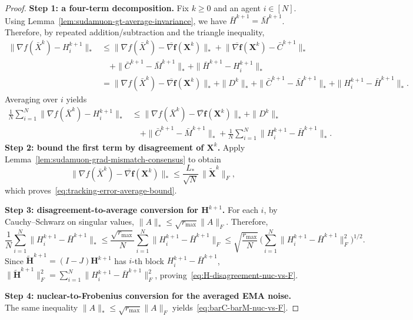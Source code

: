 \documentclass{article}
\begin{document}
\begin{proof}
\medskip\noindent\textbf{Step 1: a four-term decomposition.}
Fix $k\ge 0$ and an agent $i\in[N]$.
Using Lemma~\ref{lem:sudamuon-gt-average-invariance}, we have $\bar H^{k+1}=\bar M^{k+1}$.
Therefore, by repeated addition/subtraction and the triangle inequality,
\begin{align*}
\|\nabla f(\bar X^k)-H_i^{k+1}\|_*
&\le
\Big\|\nabla f(\bar X^k)-\overline{\nabla \mathbf f}(\mathbf X^k)\Big\|_*
+\Big\|\overline{\nabla \mathbf f}(\mathbf X^k)-\bar C^{k+1}\Big\|_* \\
&\quad +\|\bar C^{k+1}-\bar M^{k+1}\|_* + \|\bar H^{k+1}-H_i^{k+1}\|_* \\
&=
\Big\|\nabla f(\bar X^k)-\overline{\nabla \mathbf f}(\mathbf X^k)\Big\|_*
+\|D^k\|_* 
+\|\bar C^{k+1}-\bar M^{k+1}\|_* 
+\|H_i^{k+1}-\bar H^{k+1}\|_*.
\end{align*}
Averaging over $i$ yields
\begin{align*}
\frac{1}{N}\sum_{i=1}^N \|\nabla f(\bar X^k)-H_i^{k+1}\|_*
&\le
\Big\|\nabla f(\bar X^k)-\overline{\nabla \mathbf f}(\mathbf X^k)\Big\|_*
+\|D^k\|_* \\
&\quad+\|\bar C^{k+1}-\bar M^{k+1}\|_* 
+\frac{1}{N}\sum_{i=1}^N\|H_i^{k+1}-\bar H^{k+1}\|_*.
\end{align*}
\medskip\noindent\textbf{Step 2: bound the first term by disagreement of $\mathbf X^k$.}
Apply Lemma~\ref{lem:sudamuon-grad-mismatch-consensus} to obtain
\[
\Big\|\nabla f(\bar X^k)-\overline{\nabla \mathbf f}(\mathbf X^k)\Big\|_*
\le \frac{L_*}{\sqrt N}\,\|\tilde{\mathbf X}^k\|_F,
\]
which proves~\eqref{eq:tracking-error-average-bound}.

\medskip\noindent\textbf{Step 3: disagreement-to-average conversion for $\mathbf H^{k+1}$.}
For each $i$, by Cauchy--Schwarz on singular values, $\|A\|_*\le \sqrt{r_{\max}}\|A\|_F$.
Therefore,
\[
\frac{1}{N}\sum_{i=1}^N\|H_i^{k+1}-\bar H^{k+1}\|_*
\le \frac{\sqrt{r_{\max}}}{N}\sum_{i=1}^N\|H_i^{k+1}-\bar H^{k+1}\|_F
\le \sqrt{\frac{r_{\max}}{N}}\,\Big(\sum_{i=1}^N\|H_i^{k+1}-\bar H^{k+1}\|_F^2\Big)^{1/2}.
\]
Since $\tilde{\mathbf H}^{k+1}=(I-J)\mathbf H^{k+1}$ has $i$-th block $H_i^{k+1}-\bar H^{k+1}$,
$\|\tilde{\mathbf H}^{k+1}\|_F^2=\sum_{i=1}^N\|H_i^{k+1}-\bar H^{k+1}\|_F^2$, proving~\eqref{eq:H-disagreement-nuc-vs-F}.

\medskip\noindent\textbf{Step 4: nuclear-to-Frobenius conversion for the averaged EMA noise.}
The same inequality $\|A\|_*\le \sqrt{r_{\max}}\|A\|_F$ yields~\eqref{eq:barC-barM-nuc-vs-F}.
\end{proof}
\end{document}
